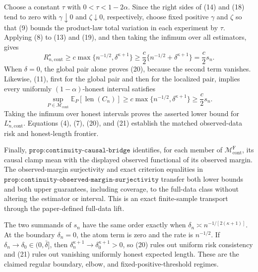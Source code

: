 Choose a constant \(\tau\) with \(0<\tau<1-2\alpha\).  Since the right sides of (14) and (18) tend to zero with \(\gamma\downarrow0\) and \(\zeta\downarrow0\), respectively, choose fixed positive \(\gamma\) and \(\zeta\) so that (9) bounds the product-law total variation in each experiment by \(\tau\).  Applying (8) to (13) and (19), and then taking the infimum over all estimators, gives
\[
 R_{n,\mathrm{cont}}^\star
 \geq c\max\{n^{-1/2},\delta^{\kappa+1}\}
 \geq\frac c2\{n^{-1/2}+\delta^{\kappa+1}\}
 =\frac c2s_n. \tag{20}
\]
When \(\delta=0\), the global pair alone proves (20), because the second term vanishes.  Likewise, (11), first for the global pair and then for the localized pair, implies every uniformly \((1-\alpha)\)-honest interval satisfies
\[
 \sup_{P\in\mathcal M_{\mathrm{cont}}}
 \mathbb E_P[\operatorname{len}(C_n)]
 \geq c\max\{n^{-1/2},\delta^{\kappa+1}\}
 \geq\frac c2s_n. \tag{21}
\]
Taking the infimum over honest intervals proves the asserted lower bound for \(L_{n,\mathrm{cont}}^\star\).  Equations (4), (7), (20), and (21) establish the matched observed-data risk and honest-length frontier.

Finally, \(\texttt{prop:continuity-causal-bridge}\) identifies, for each member of \(\mathcal M_{\mathrm{cont}}^{\mathrm F}\), its causal clamp mean with the displayed observed functional of its observed margin.  The observed-margin surjectivity and exact criterion equalities in \(\texttt{prop:continuity-observed-margin-surjectivity}\) transfer both lower bounds and both upper guarantees, including coverage, to the full-data class without altering the estimator or interval.  This is an exact finite-sample transport through the paper-defined full-data lift.

The two summands of \(s_n\) have the same order exactly when
\(\delta_n\asymp n^{-1/[2(\kappa+1)]}\).  At the boundary \(\delta_n=0\), the atom term is zero and the rate is \(n^{-1/2}\).  If \(\delta_n\to\delta_0\in(0,\bar\delta]\), then \(\delta_n^{\kappa+1}\to\delta_0^{\kappa+1}>0\), so (20) rules out uniform risk consistency and (21) rules out vanishing uniformly honest expected length.  These are the claimed regular boundary, elbow, and fixed-positive-threshold regimes.